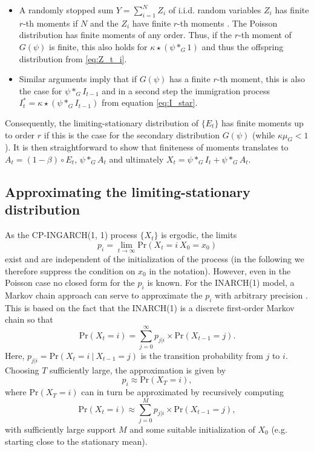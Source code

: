 \documentclass{article}
\begin{document}
\begin{itemize}
\item A randomly stopped sum $Y = \sum_{i = 1}^N Z_i$ of i.i.d. random variables $Z_i$ has finite $r$-th moments if $N$ and the $Z_i$ have finite $r$-th moments \cite[Theorem 5.2]{Gut2009}. The Poisson distribution has finite moments of any order. Thus, if the $r$-th moment of $G(\psi)$ is finite, this also holds for $\kappa \star (\psi *_G 1)$ and thus the offspring distribution from \eqref{eq:Z_t_i}.
\item Similar arguments imply that if $G(\psi)$ has a finite $r$-th moment, this is also the case for $\psi *_G I_{t - 1}$ and in a second step the immigration process $I^*_t = \kappa \star(\psi *_G I_{t - 1})$ from equation \eqref{eq:I_star}.
\end{itemize}
Consequently, the limiting-stationary distribution of $\{E_t\}$ has finite moments up to order $r$ if this is the case for the secondary distribution $G(\psi)$ (while $\kappa\mu_G < 1$). It is then straightforward to show that finiteness of moments translates to $A_t = (1 - \beta) \circ E_t$, $\psi *_G A_t$ and ultimately $X_t = \psi *_G I_t + \psi *_G A_t$.
%
%

\subsection{Approximating the limiting-stationary distribution}

As the CP-INGARCH(1, 1) process $\{X_t\}$ is ergodic, the limits %
$$
p_i = \lim_{t \rightarrow \infty} \text{Pr}(X_t = i \ X_0 = x_0)
$$
exist and are independent of the initialization of the process (in the following we therefore suppress the condition on $x_0$ in the notation). However, even in the Poisson case no closed form for the $p_i$ is known. For the INARCH(1) model, a Markov chain approach can serve to approximate the $p_i$ with arbitrary precision \cite{Weiss2010}. This is based on the fact that the INARCH(1) is a discrete first-order Markov chain so that
$$
\text{Pr}(X_t = i) = \sum_{j = 0}^\infty p_{j|i} \times \text{Pr}(X_{t - 1} = j).
$$
Here, $p_{j|i} = \text{Pr}(X_t = i \ | \ X_{t - 1} = j) $ is the transition probability from $j$ to $i$. Choosing $T$ sufficiently large, the approximation is given by
$$
p_i \approx \text{Pr}(X_T = i),
$$
where $\text{Pr}(X_T = i)$ can in turn be approximated by recursively computing
$$
\text{Pr}(X_t = i) \approx \sum_{j = 0}^M p_{j|i} \times \text{Pr}(X_{t - 1} = j),
$$
with sufficiently large support $M$ and some suitable initialization of $X_0$ (e.g. starting close to the stationary mean).
\end{document}
